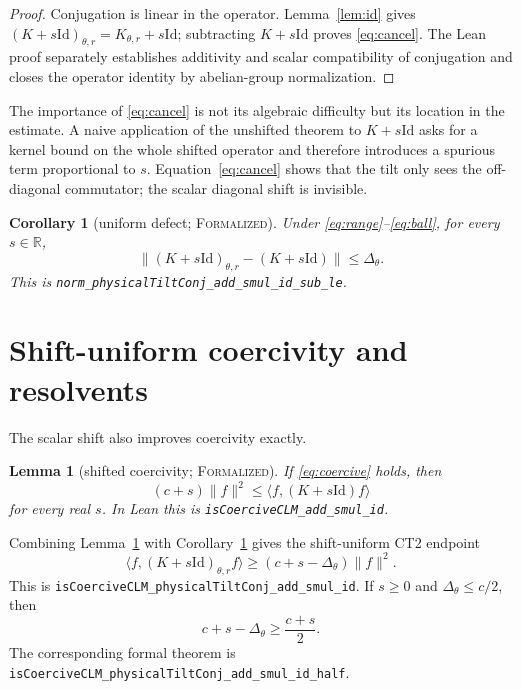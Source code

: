 \documentclass[11pt]{article}
\newtheorem{lemma}[theorem]{Lemma}
\newtheorem{corollary}[theorem]{Corollary}
\theoremstyle{definition}
\newcommand{\R}{\mathbb{R}}
\newcommand{\Id}{\mathrm{Id}}
\newcommand{\inn}[2]{\langle #1,#2\rangle}
\newcommand{\norm}[1]{\lVert #1\rVert}
\newcommand{\lean}[1]{\texttt{#1}}
\newcommand{\formalized}{\textsc{Formalized}}
\begin{document}
\begin{proof}
Conjugation is linear in the operator.  Lemma~\ref{lem:id} gives
$(K+s\Id)_{\theta,r}=K_{\theta,r}+s\Id$; subtracting $K+s\Id$ proves
\eqref{eq:cancel}.  The Lean proof separately establishes additivity and
scalar compatibility of conjugation and closes the operator identity by
abelian-group normalization.
\end{proof}

The importance of \eqref{eq:cancel} is not its algebraic difficulty but its
location in the estimate.  A naive application of the unshifted theorem to
$K+s\Id$ asks for a kernel bound on the whole shifted operator and therefore
introduces a spurious term proportional to $s$.  Equation~\eqref{eq:cancel}
shows that the tilt only sees the off-diagonal commutator; the scalar diagonal
shift is invisible.

\begin{corollary}[uniform defect; \formalized]\label{cor:defect}
Under \eqref{eq:range}--\eqref{eq:ball}, for every $s\in\R$,
\[
 \norm{(K+s\Id)_{\theta,r}-(K+s\Id)}\le\Delta_\theta.
\]
This is \lean{norm\_physicalTiltConj\_add\_smul\_id\_sub\_le}.
\end{corollary}

\section{Shift-uniform coercivity and resolvents}\label{sec:resolvent}

The scalar shift also improves coercivity exactly.

\begin{lemma}[shifted coercivity; \formalized]\label{lem:coershift}
If \eqref{eq:coercive} holds, then
\[
  (c+s)\norm f^2\le\inn f{(K+s\Id)f}
\]
for every real $s$.  In Lean this is
\lean{isCoerciveCLM\_add\_smul\_id}.
\end{lemma}

Combining Lemma~\ref{lem:coershift} with
Corollary~\ref{cor:defect} gives the shift-uniform CT2 endpoint
\begin{equation}\label{eq:tiltcoer}
 \inn f{(K+s\Id)_{\theta,r}f}
 \ge(c+s-\Delta_\theta)\norm f^2.
\end{equation}
This is
\lean{isCoerciveCLM\_physicalTiltConj\_add\_smul\_id}.
If $s\ge0$ and $\Delta_\theta\le c/2$, then
\begin{equation}\label{eq:half}
  c+s-\Delta_\theta\ge\frac{c+s}{2}.
\end{equation}
The corresponding formal theorem is
\lean{isCoerciveCLM\_physicalTiltConj\_add\_smul\_id\_half}.
\end{document}
